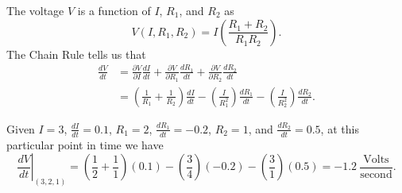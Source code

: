 \begin{activitySolution}
\ba 
\item The voltage $V$ is a function of $I$, $R_1$, and $R_2$ as
\[V(I, R_1, R_2) = I\left(\frac{R_1+R_2}{R_1R_2}\right).\]
The Chain Rule tells us that 
\begin{align*}
\frac{dV}{dt} &= \frac{\partial V}{\partial I} \frac{dI}{dt} + \frac{\partial V}{\partial R_1} \frac{dR_1}{dt} + \frac{\partial V}{\partial R_2} \frac{dR_2}{dt}   \\
	&= \left(\frac{1}{R_1} + \frac{1}{R_2}\right) \frac{dI}{dt} - \left(\frac{I}{R_1^2}\right) \frac{dR_1}{dt} - \left(\frac{I}{R_2^2} \right) \frac{dR_2}{dt}.
\end{align*}

\item Given $I = 3$, $\frac{dI}{dt} = 0.1$, $R_1 = 2$, $\frac{dR_1}{dt} = -0.2$, $R_2 = 1$, and  $\frac{dR_2}{dt} = 0.5$, at this particular point in time we have 
\[\left. \frac{dV}{dt}\right|_{(3,2,1)} = \left(\frac{1}{2}+\frac{1}{1}\right) (0.1) - \left(\frac{3}{4}\right) (-0.2) - \left(\frac{3}{1} \right) (0.5) = -1.2 \ \frac{\text{Volts}}{\text{second}}.\]

\ea

 
\end{activitySolution}
\aftera